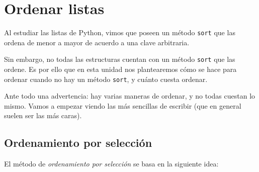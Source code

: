 \chapter{Ordenar listas}

Al estudiar las listas de Python, vimos que poseen un método \lstinline!sort!
que las ordena de menor a mayor de acuerdo a una clave arbitraria.

Sin embargo, no todas las estructuras cuentan con un método
\lstinline!sort! que las ordene.  Es por ello que en esta unidad nos
plantearemos cómo se hace para ordenar cuando no hay un método
\lstinline!sort!, y cuánto cuesta ordenar.

Ante todo una advertencia: hay varias maneras de ordenar, y no todas
cuestan lo mismo. Vamos a empezar viendo las más sencillas de escribir
(que en general suelen ser las más caras).

\section{Ordenamiento por selección}
El método de \emph{ordenamiento por selección} se basa en la siguiente idea:


